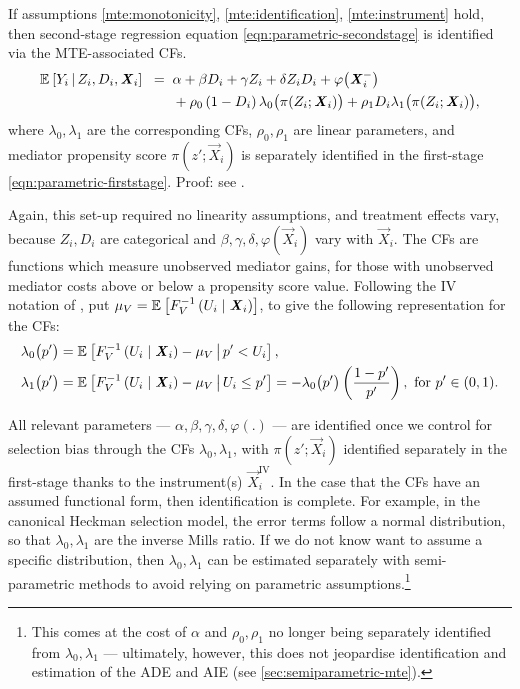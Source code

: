 \begin{proposition}
    \label{proposition:secondstage}
    If assumptions \ref{mte:monotonicity}, \ref{mte:identification}, \ref{mte:instrument} hold, then second-stage regression equation \eqref{eqn:parametric-secondstage} is identified via the MTE-associated CFs.
    \begin{align*}
        \mathbb{E}_{} \left[ Y_i \, \middle\vert \, Z_i, D_i, \boldsymbol{\mathit{X}}_i \right] \;\; =& \;\;
            \alpha
            + \beta D_i
            + \gamma Z_i
            + \delta Z_i D_i
            + \varphi\big(\boldsymbol{\mathit{X}}_i^-\big) \\
            & \;\; + \rho_0 \left( 1 - D_i \right) \lambda_0 \big( \pi(Z_i ; \boldsymbol{\mathit{X}}_i) \big)
                + \rho_1 D_i \lambda_1 \big( \pi(Z_i ; \boldsymbol{\mathit{X}}_i) \big),
            \label{eqn:mte-secondstage}
    \end{align*}
    where $\lambda_0, \lambda_1$ are the corresponding CFs, $\rho_0, \rho_1$ are linear parameters, and mediator propensity score $\pi(z';\vec X_i)$ is separately identified in the first-stage \eqref{eqn:parametric-firststage}.
    Proof: see .
\end{proposition}
Again, this set-up required no linearity assumptions, and treatment effects vary, because $Z_i, D_i$ are categorical and  $\beta, \gamma, \delta , \varphi(\vec X_i)$ vary with $\vec X_i$.
The CFs are functions which measure unobserved mediator gains, for those with unobserved mediator costs above or below a propensity score value.
Following the IV notation of \cite{kline2019heckits}, put $\mu_V = \mathbb{E}_{} \left[ F_V^{-1}\left( U_i \mid \boldsymbol{\mathit{X}}_i \right) \right]$, to give the following representation for the CFs:
\begin{align*}
    \lambda_0\big(p'\big) &=
        \mathbb{E}_{} \left[  F_V^{-1}\left( U_i \mid \boldsymbol{\mathit{X}}_i \right) - \mu_V \, \middle\vert \, p' < U_i \right], \\
    \lambda_1\big(p'\big) &=
        \mathbb{E}_{} \left[  F_V^{-1}\left( U_i \mid \boldsymbol{\mathit{X}}_i \right) - \mu_V \, \middle\vert \, U_i \leq p' \right] = 
            -\lambda_0\big( p' \big) \left(\frac{1-p'}{p'}\right), \text{ for } p' \in (0,1).
\end{align*}

All relevant parameters --- $\alpha, \beta, \gamma, \delta, \varphi(.)$ --- are identified once we control for selection bias through the CFs $\lambda_0, \lambda_1$, with $\pi(z';\vec X_i)$ identified separately in the first-stage thanks to the instrument(s) $\vec X_i^{\text{IV}}$.
In the case that the CFs have an assumed functional form, then identification is complete.
For example, in the canonical Heckman selection model, the error terms follow a normal distribution, so that $\lambda_0, \lambda_1$ are the inverse Mills ratio.
If we do not know want to assume a specific distribution, then $\lambda_0, \lambda_1$ can be estimated separately with semi-parametric methods to avoid relying on parametric assumptions.\footnote{
    This comes at the cost of $\alpha$ and $\rho_0, \rho_1$ no longer being separately identified from $\lambda_0, \lambda_1$ --- ultimately, however, this does not jeopardise identification and estimation of the ADE and AIE (see \autoref{sec:semiparametric-mte}).
}

